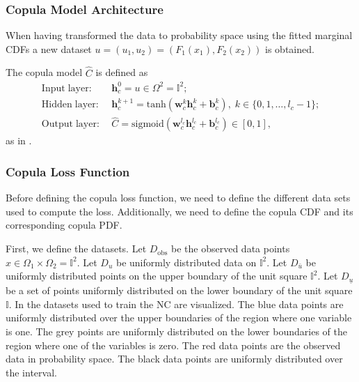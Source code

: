 \subsubsection{Copula Model Architecture} 
When having transformed the data to probability space using the fitted marginal \gls{CDF}s a new dataset $u = (u_1,u_2) = (F_1(x_1), F_2(x_2))$ is obtained. 

The copula model $\hat{C}$ is defined as 
\begin{align*}
    \mathrm{Input\;layer:} \; & \mathbf{h}_c^0 = u \in \Omega^2 = \mathbb{I}^2; \\
    \mathrm{Hidden\;layer:} \; & \mathbf{h}_c^{k+1} = \mathrm{tanh}(\mathbf{w}_c^{k} \mathbf{h}_c^{k} + \mathbf{b}_c^{k}), \; k \in \{0,1, \dots, l_c -1 \};\\
    \mathrm{Output\;layer:} \; & \hat{C} = \mathrm{sigmoid}(\mathbf{w}_c^{l_c} \mathbf{h}_c^{l_c} + \mathbf{b}_c^{l_c}) \in \left[0,1 \right],
\end{align*}
as in .


\subsubsection{Copula Loss Function}\label{sec:NeuralCopulaLoss}
Before defining the copula loss function, we need to define the different data sets used to compute the loss. Additionally, we need to define the copula \gls{CDF} and its corresponding copula \gls{PDF}. 

First, we define the datasets. Let $D_{\mathrm{obs}}$ be the observed data points $x \in \Omega_1 \times \Omega_2  = \mathbb{I}^2$. Let $D_{u}$ be uniformly distributed data on $\mathbb{I}^2$. Let $D_{\bar{u}}$ be uniformly distributed points on the upper boundary of the unit square $\mathbb{I}^2$. Let $D_{\underline{u}}$ be a set of points uniformly distributed on the lower boundary of the unit square $\mathbb{I}$. In  the datasets used to train the \gls{NC} are visualized. The blue data points are uniformly distributed over the upper boundaries of the region where one variable is one. The grey points are uniformly distributed on the lower boundaries of the region where one of the variables is zero. The red data points are the observed data in probability space. The black data points are uniformly distributed over the interval. 

